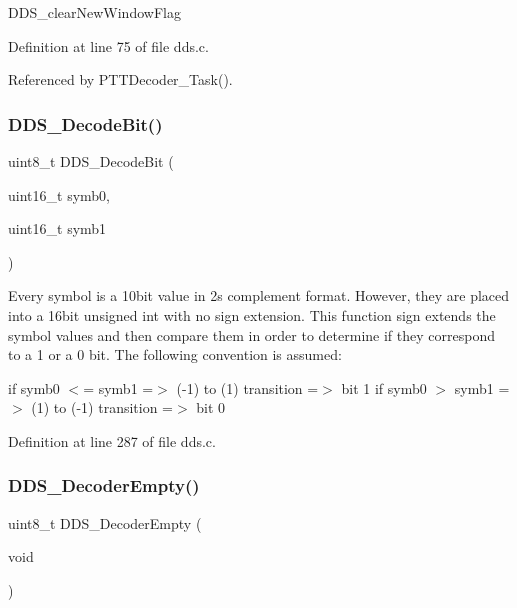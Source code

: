 D\+D\+S\+\_\+clear\+New\+Window\+Flag 

Definition at line 75 of file dds.\+c.



Referenced by P\+T\+T\+Decoder\+\_\+\+Task().

\mbox{\label{group___d_d_s_ga249a36f3fa12baff1cf03b7f6a8a0cac}} 
\subsubsection{\texorpdfstring{D\+D\+S\+\_\+\+Decode\+Bit()}{DDS\_DecodeBit()}}
{\footnotesize\ttfamily uint8\+\_\+t D\+D\+S\+\_\+\+Decode\+Bit (\begin{DoxyParamCaption}\item[{uint16\+\_\+t}]{symb0,  }\item[{uint16\+\_\+t}]{symb1 }\end{DoxyParamCaption})}

Every symbol is a 10bit value in 2\textquotesingle{}s complement format. However, they are placed into a 16bit unsigned int with no sign extension. This function sign extends the symbol values and then compare them in order to determine if they correspond to a 1 or a 0 bit. The following convention is assumed\+:

if symb0 $<$= symb1 =$>$ (-\/1) to (1) transition =$>$ bit 1 if symb0 $>$ symb1 =$>$ (1) to (-\/1) transition =$>$ bit 0 

Definition at line 287 of file dds.\+c.

\mbox{\label{group___d_d_s_gadafd1ef25b1e3bff8f5975e3001244c0}} 
\subsubsection{\texorpdfstring{D\+D\+S\+\_\+\+Decoder\+Empty()}{DDS\_DecoderEmpty()}}
{\footnotesize\ttfamily uint8\+\_\+t D\+D\+S\+\_\+\+Decoder\+Empty (\begin{DoxyParamCaption}\item[{void}]{ }\end{DoxyParamCaption})}

